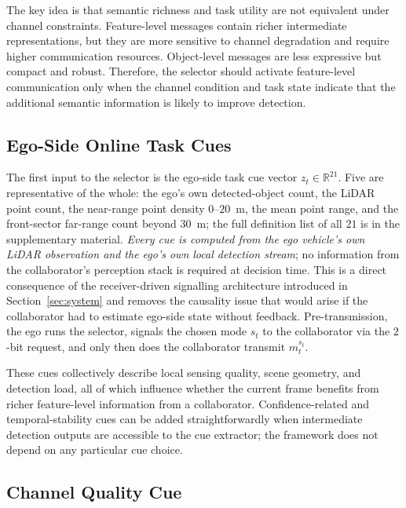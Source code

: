 \documentclass[journal]{IEEEtran}
\begin{document}
The key idea is that semantic richness and task utility are not equivalent under channel constraints. Feature-level messages contain richer intermediate representations, but they are more sensitive to channel degradation and require higher communication resources. Object-level messages are less expressive but compact and robust. Therefore, the selector should activate feature-level communication only when the channel condition and task state indicate that the additional semantic information is likely to improve detection.

\subsection{Ego-Side Online Task Cues}\label{sec:cues}

The first input to the selector is the ego-side task cue vector $z_t \in \mathbb{R}^{21}$. Five are representative of the whole: the ego's own detected-object count, the LiDAR point count, the near-range point density $0$--$20$~m, the mean point range, and the front-sector far-range count beyond $30$~m; the full definition list of all $21$ is in the supplementary material. \emph{Every cue is computed from the ego vehicle's own LiDAR observation and the ego's own local detection stream}; no information from the collaborator's perception stack is required at decision time. This is a direct consequence of the receiver-driven signalling architecture introduced in Section~\ref{sec:system} and removes the causality issue that would arise if the collaborator had to estimate ego-side state without feedback. Pre-transmission, the ego runs the selector, signals the chosen mode $s_t$ to the collaborator via the $2$-bit request, and only then does the collaborator transmit $m_t^{s_t}$.



These cues collectively describe local sensing quality, scene geometry, and detection load, all of which influence whether the current frame benefits from richer feature-level information from a collaborator. Confidence-related and temporal-stability cues can be added straightforwardly when intermediate detection outputs are accessible to the cue extractor; the framework does not depend on any particular cue choice.

\subsection{Channel Quality Cue}
\end{document}
